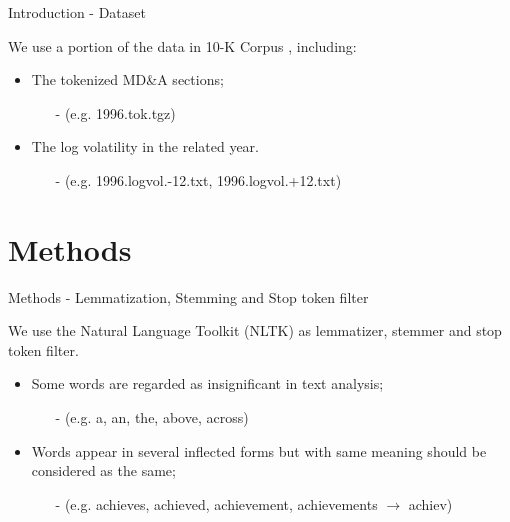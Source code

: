 \documentclass{beamer}
\begin{document}
\begin{frame}{Introduction - Dataset}

  We use a portion of the data in 10-K Corpus , including: \vspace{.25cm}

  \begin{itemize}
    \item The tokenized MD\&A sections;
          \begin{itemize}
            \item[-] (e.g. 1996.tok.tgz) \vspace{.25cm}
          \end{itemize}
    \item The log volatility in the related year.
          \begin{itemize}
            \item[-] (e.g. 1996.logvol.-12.txt, 1996.logvol.+12.txt) \vspace{.25cm}
          \end{itemize}
  \end{itemize}

\end{frame}

\section{Methods}

\begin{frame}{Methods - Lemmatization, Stemming and Stop token filter}

  We use the Natural Language Toolkit (NLTK)  as lemmatizer, stemmer and stop token filter. \vspace{.25cm}

  \begin{itemize}
    \item Some words are regarded as insignificant in text analysis;
          \begin{itemize}
            \item[-] (e.g. a, an, the, above, across) \vspace{.25cm}
          \end{itemize}
    \item Words appear in several inflected forms but with same meaning should be considered as the same;
          \begin{itemize}
            \item[-] (e.g. {achieves, achieved, achievement, achievements} $\rightarrow$ achiev) \vspace{.25cm}
          \end{itemize}
  \end{itemize}

\end{frame}
\end{document}

